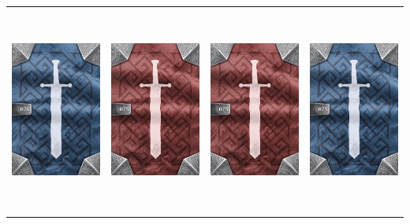 \documentclass{minimal}
\begin{document}
{\begin{longtable}{llll}
\includegraphics[width=44mm,height=68mm]{./64-151/gh-076a-chain-hood-back.png} &
\includegraphics[width=44mm,height=68mm]{./64-151/gh-075b-circlet-of-elements-back.png} &
\includegraphics[width=44mm,height=68mm]{./64-151/gh-075b-circlet-of-elements-back.png} &
\includegraphics[width=44mm,height=68mm]{./64-151/gh-075a-circlet-of-elements-back.png}\\ 

\end{longtable}}
\end{document}
